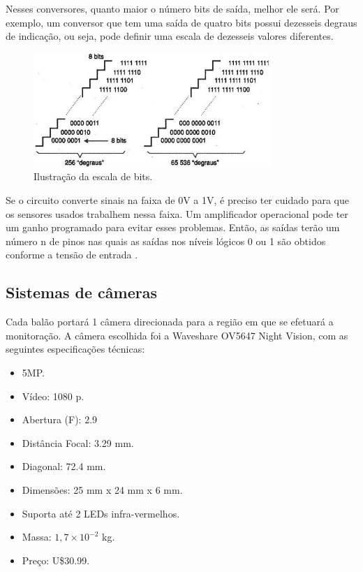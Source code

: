 Nesses conversores, quanto maior o número bits de saída, melhor ele será. Por exemplo, um conversor que tem uma saída de quatro bits possui dezesseis degraus de indicação, ou seja, pode definir uma escala de dezesseis valores diferentes.

\begin{figure}[H]
  \centering
  \includegraphics[width=0.8\textwidth]{figuras/ADC}
  \caption{Ilustração da escala de bits.}
  \label{img:escaladebits}
\end{figure}

Se o circuito converte sinais na faixa de 0V a 1V, é preciso ter cuidado para que os sensores usados trabalhem nessa faixa. Um amplificador operacional pode ter um ganho programado para evitar esses problemas. Então, as saídas terão um número n de pinos nas quais as saídas nos níveis lógicos 0 ou 1 são obtidos conforme a tensão de entrada \cite{conversoresad}.

\subsection{Sistemas de câmeras}

Cada balão portará 1 câmera direcionada para a região em que se efetuará a monitoração. A câmera escolhida foi a Waveshare OV5647 Night Vision, com as seguintes especificações técnicas:

\begin{itemize}
	\item 5MP.
	\item Vídeo: 1080 p.
	\item Abertura (F): 2.9
	\item Distância Focal: 3.29 mm.
	\item Diagonal: 72.4 mm.
	\item Dimensões: 25 mm x 24 mm x 6 mm.
	\item Suporta até 2 LEDs infra-vermelhos.
	\item Massa: $1,7\times 10^{-2}$ kg.
	\item Preço: U\$30.99.
\end{itemize}


